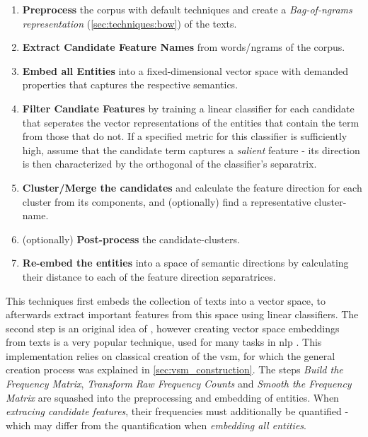\label{sec:algorithmsteps}
\begin{enumerate}
	\item[\saveref{sec:algo_preproc}{1.}] \textbf{Preprocess} the corpus with default techniques and create a \textit{Bag-of-ngrams representation} (\ref{sec:techniques:bow}) of the texts.
	\item[\saveref{sec:extract_cands}{2.}] \textbf{Extract Candidate Feature Names} from words/\glspl{ngram} of the corpus.
	\item[\saveref{sec:generate_vectorspaces}{3.}] \textbf{Embed all Entities} into a fixed-dimensional vector space with demanded properties that captures the respective semantics.
	\item[\saveref{sec:svm_filter_cands}{4.}] \textbf{Filter Candiate Features} by training a linear classifier for each candidate that seperates the vector representations of the entities that contain the term from those that do not. If a specified metric for this classifier is sufficiently high, assume that the candidate term captures a \textit{salient} feature - its direction is then characterized by the orthogonal of the classifier's separatrix.
	\item[\saveref{sec:algo:cluster}{5.}] \textbf{Cluster/Merge the candidates} and calculate the feature direction for each cluster from its components, and (optionally) find a representative cluster-name.
	\item[\saveref{sec:algo:postprocess}{6.}] (optionally) \textbf{Post-process} the candidate-clusters.
	\item[\saveref{sec:algo:reembed}{7.}] \textbf{Re-embed the entities} into a space of semantic directions by calculating their distance to each of the feature direction separatrices.	
\end{enumerate}

This techniques first embeds the collection of texts into a  vector space, to afterwards extract important features from this space using linear classifiers. The second step is an original idea of \cite{Derrac2015}, however creating vector space embeddings from texts is a very popular technique, used for many tasks in \gls{nlp} \cite{Mikolov:Regularities,Mikolov2013a,Guo,Lowe,Turney2010}. This implementation relies on classical creation of the \gls{vsm}, for which the general creation process was explained in \autoref{sec:vsm_construction}. The steps \textit{Build the Frequency Matrix}, \textit{Transform Raw Frequency Counts} and \textit{Smooth the Frequency Matrix} are squashed into the preprocessing and embedding of entities. When \textit{extracing candidate features}, their frequencies must additionally be quantified - which may differ from the quantification when \textit{embedding all entities}.

